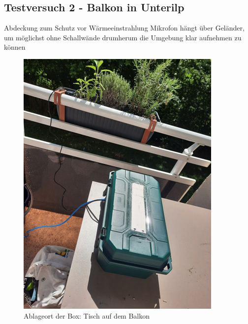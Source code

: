 \subsection{Testversuch 2  - Balkon in Unterilp}


Abdeckung zum Schutz vor Wärmeeinstrahlung
Mikrofon hängt über Geländer, um möglichst ohne Schallwände drumherum die Umgebung klar aufnehmen zu können
\begin{figure}
    \centering
    \includegraphics[width=1\linewidth]{bilder/balkon_01.png}
    \caption{Ablageort der Box: Tisch auf dem Balkon}
    \label{fig:enter-label}
\end{figure}

